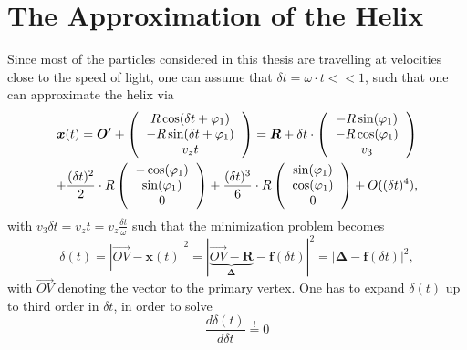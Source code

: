 
\chapter{The Approximation of the Helix} %

\label{AppendixA}
Since most of the particles considered in this thesis are travelling at velocities close to the speed of light, one can assume that $\delta t = \omega \cdot t << 1$, such that one can approximate the helix via
\begin{multline}
	\boldsymbol{x}(t) = \boldsymbol{O'} +  \left(\begin{tabular}{c}
	$R\cos(\delta t + \varphi_1) $\\ 
	$-R\sin(\delta t + \varphi_1) $\\ 
	$v_z t $
	\end{tabular} \right) = \boldsymbol{R} +  \delta t \cdot \left(\begin{tabular}{c}
	$-R\sin(\varphi_1) $\\ 
	$-R\cos(\varphi_1) $\\ 
	$v_3$
	\end{tabular}\right) \\ +\frac{(\delta t)^2}{2} \cdot R \left(\begin{tabular}{c}
	$-\cos(\varphi_1) $\\ 
	$\sin(\varphi_1) $\\ 
	$0$
	\end{tabular}\right)+\frac{(\delta t)^3}{6} \cdot R \left(\begin{tabular}{c}
	$\sin(\varphi_1) $\\ 
	$\cos(\varphi_1) $\\ 
	$0$
	\end{tabular}\right)+O((\delta t)^4),
\end{multline}
with $v_3 \delta t = v_z t = v_z \frac{\delta t}{\omega}$ such that the minimization problem becomes
\begin{equation}
	\delta(t) = |\overrightarrow{OV}-\boldsymbol{x}(t)|^2 = |\underbrace{\overrightarrow{OV}-\boldsymbol{R}}_\text{$\boldsymbol{\Delta}$}-\boldsymbol{f}(\delta t)|^2 = |\boldsymbol{\Delta}-\boldsymbol{f}(\delta t)|^2,
\end{equation}
with $\overrightarrow{OV}$ denoting the vector to the primary vertex. One has to expand $\delta(t)$ up to third order in $\delta t$, in order to solve
\begin{equation}
	\frac{d\delta(t)}{d\delta t} \stackrel{!}{=} 0
\end{equation}

